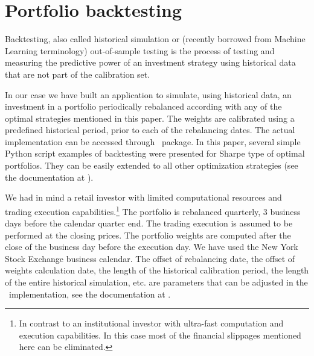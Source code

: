 
\section{Portfolio backtesting}\label{backtesting}

Backtesting, also called historical simulation or (recently borrowed from Machine Learning terminology) out-of-sample testing
is the process of testing and measuring the predictive power of an investment strategy using historical data that are not part of the calibration set.

In our case we have built an application to simulate, using historical data, an investment in a portfolio periodically rebalanced according with any of the
optimal strategies mentioned in this paper. The weights are calibrated using a predefined historical period, prior to each of the rebalancing dates.
The actual implementation can be accessed through \azapy\ package. In this paper, several simple Python script examples of backtesting were presented for Sharpe type of optimal
portfolios. They can be easily extended to all other optimization strategies (see the documentation at \azapydoc).

We had in mind a retail investor with limited computational resources and trading execution capabilities.\footnote{In contrast to an
institutional investor with ultra-fast computation and execution capabilities. In this case most of the financial slippages mentioned here can be eliminated.}
The portfolio is rebalanced quarterly, 3 business days before the calendar quarter end. The trading execution is assumed to
be performed at the closing prices.
The portfolio weights are computed after the close of the business day before the
execution day.
We have used the New York Stock Exchange business calendar.
The offset of rebalancing date, the offset of weights calculation date, the length of the historical calibration period,
the length of the entire historical simulation, etc. are parameters that can be adjusted in the \azapy\ implementation, see the documentation at \azapydoc.


